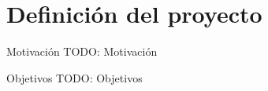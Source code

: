 \section{Definición del proyecto}

\begin{frame}{Motivación}
  TODO: Motivación
\end{frame}

\begin{frame}{Objetivos}
  TODO: Objetivos
\end{frame}
